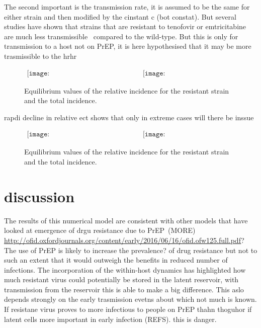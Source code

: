 \documentclass[DIV=15]{scrartcl}
\begin{document}
The second important  is the transmission rate, it is assumed to be the same for either strain and then modified by the cinstant c (bot constat). But several studies have shown that strains that are resistant to tenofovir or emtricitabine  are much less transmissible~\cite{cong2011,chateau2013,drams} compared to the wild-type. But this is only for transmission to a host not on PrEP, it is here hypothesised that it may be more trasmissible to the hrhr 
  
  
    \begin{figure*}[h]
 \begin{center}$
 \begin{array}{cc}
 \texttt{[image: CostsTotalIncidence\_21-06a]} &
 \texttt{[image: CostsIncidence\_21-06a]}
 \end{array}$
 \end{center}
	\caption{ Equilibrium values of the relative incidence for the resistant strain 
	and the total incidence.   }
\label{cost} 
\end{figure*}
  
  rapdi decline in relative ect shows that only in extreme cases will there be inssue   
  
  
      \begin{figure*}[h]
 \begin{center}$
 \begin{array}{cc}
 \texttt{[image: transrLTotalIncidence\_21-06a]} &
 \texttt{[image: transrLIncidence\_21-06a]}
 \end{array}$
 \end{center}
	\caption{ Equilibrium values of the relative incidence for the resistant strain 
	and the total incidence.   }
\label{cost} 
\end{figure*}



  
\section{discussion}  
  
  
  The  results of this numerical  model  are consistent with other models that have looked at emergence of drgu resistance due to PrEP~\citep{abbas2013}(MORE) \url{http://ofid.oxfordjournals.org/content/early/2016/06/16/ofid.ofw125.full.pdf}? The use of PrEP is likely to increase the prevalence? of drug resistance  but not to such an extent that it would outweigh the benefits in reduced number of infections. The incorporation of the within-host dynamics has highlighted  how much resistant virus could potentially be stored in the latent reservoir, with transmission from the reservoir this is able to make a big difference. This aslo depends strongly on the early trasmission evetns about which not much is known. If resistane virus proves to more infectious to people on PrEP thahn thoguhor if latent cells more important in early infection (REFS). this  is danger.
  
\end{document}
